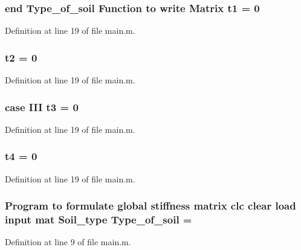 \subsubsection[{t1}]{\setlength{\rightskip}{0pt plus 5cm}end {\bf Type\+\_\+of\+\_\+soil} Function to write Matrix t1 = 0}\label{a00005_a3a318718cf4c9c1380475d059171d8f3}


Definition at line 19 of file main.\+m.

\hypertarget{a00005_a24aeadb733f27244ec14e4cba82eeee9}{}
\subsubsection[{t2}]{\setlength{\rightskip}{0pt plus 5cm}t2 = 0}\label{a00005_a24aeadb733f27244ec14e4cba82eeee9}


Definition at line 19 of file main.\+m.

\hypertarget{a00005_a80d62394ff82e3ae283e9113bca340a2}{}
\subsubsection[{t3}]{\setlength{\rightskip}{0pt plus 5cm}case I\+I\+I t3 = 0}\label{a00005_a80d62394ff82e3ae283e9113bca340a2}


Definition at line 19 of file main.\+m.

\hypertarget{a00005_ae95ab11d59379638967673bd74654b2a}{}
\subsubsection[{t4}]{\setlength{\rightskip}{0pt plus 5cm}t4 = 0}\label{a00005_ae95ab11d59379638967673bd74654b2a}


Definition at line 19 of file main.\+m.

\hypertarget{a00005_a3e2c6a7e7b1f0ac68cc462d26373be9b}{}
\subsubsection[{Type\+\_\+of\+\_\+soil}]{\setlength{\rightskip}{0pt plus 5cm}Program to formulate global stiffness matrix clc clear load input mat Soil\+\_\+type Type\+\_\+of\+\_\+soil = \textquotesingle{}\textquotesingle{}}\label{a00005_a3e2c6a7e7b1f0ac68cc462d26373be9b}


Definition at line 9 of file main.\+m.

